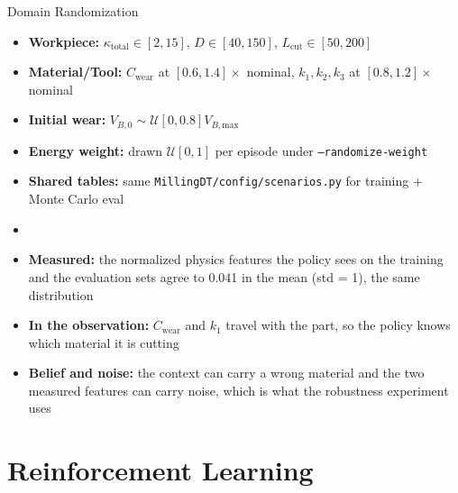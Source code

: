 \documentclass[11pt,aspectratio=169]{beamer}
\begin{document}
\begin{frame}{Domain Randomization}
    \begin{itemize}
        \item \textbf{Workpiece:} $\kappa_{\text{total}} \in [2,15]$, $D \in [40,150]$, $L_{\text{cut}} \in [50,200]$
        \item \textbf{Material/Tool:} $C_\text{wear}$ at $[0.6,1.4]\times$ nominal, $k_1, k_2, k_3$ at $[0.8,1.2]\times$ nominal
        \item \textbf{Initial wear:} $V_{B,0} \sim \mathcal{U}[0, 0.8] V_{B,\text{max}}$
        \item \textbf{Energy weight:} drawn $\mathcal{U}[0,1]$ per episode under \texttt{--randomize-weight}
        \item \textbf{Shared tables:} same \texttt{MillingDT/config/scenarios.py} for training + Monte Carlo eval
        \item \smallskip
        \item \textbf{Measured:} the normalized physics features the policy sees on the training and the evaluation sets agree to 0.041 in the mean (std = 1), the same distribution
        \item \textbf{In the observation:} $C_\text{wear}$ and $k_1$ travel with the part, so the policy knows which material it is cutting
        \item \textbf{Belief and noise:} the context can carry a wrong material and the two measured features can carry noise, which is what the robustness experiment uses
    \end{itemize}
\end{frame}

\section{Reinforcement Learning}
\end{document}
